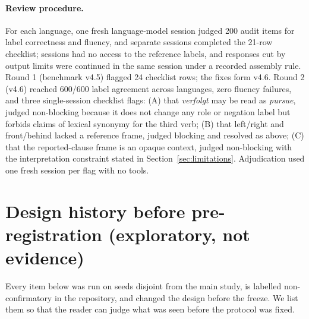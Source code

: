 \documentclass[preprint,12pt,authoryear]{elsarticle}
\begin{document}
\paragraph{Review procedure.} For each language, one fresh language-model session judged 200 audit items for label correctness and fluency, and separate sessions completed the 21-row checklist; sessions had no access to the reference labels, and responses cut by output limits were continued in the same session under a recorded assembly rule. Round 1 (benchmark v4.5) flagged 24 checklist rows; the fixes form v4.6. Round 2 (v4.6) reached 600/600 label agreement across languages, zero fluency failures, and three single-session checklist flags: (A) that \emph{verfolgt} may be read as \emph{pursue}, judged non-blocking because it does not change any role or negation label but forbids claims of lexical synonymy for the third verb; (B) that left/right and front/behind lacked a reference frame, judged blocking and resolved as above; (C) that the reported-clause frame is an opaque context, judged non-blocking with the interpretation constraint stated in Section~\ref{sec:limitations}. Adjudication used one fresh session per flag with no tools.

\section{Design history before pre-registration (exploratory, not evidence)}
\label{app:history}

Every item below was run on seeds disjoint from the main study, is labelled non-confirmatory in the repository, and changed the design before the freeze. We list them so that the reader can judge what was seen before the protocol was fixed.
\end{document}
